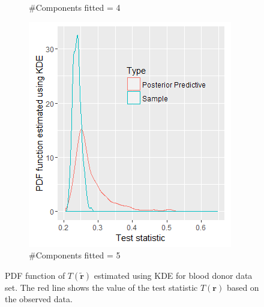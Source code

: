 \begin{figure}[!htb]
\begin{subfigure}[b]{0.4\textwidth}
          \caption{\label{fig : ppc_blood_donor_4comp}\#Components fitted = 4}
	\end{subfigure}
	\begin{subfigure}[b]{0.4\textwidth}
		\includegraphics[width=\textwidth]{mainmatter/chapter_6_blood_donor/ppc_5comp.png}	
          \caption{\label{fig : ppc_blood_donor_5comp}\#Components fitted = 5}
	\end{subfigure}
	
	\caption{PDF function of $T(\boldsymbol{\tilde{r}})$ estimated using KDE for blood donor data set. The red line shows the value of the test statistic $T(\boldsymbol{r})$ based on the observed data.}
	\label{fig : ppc_blood_donor}    
\end{figure} 

